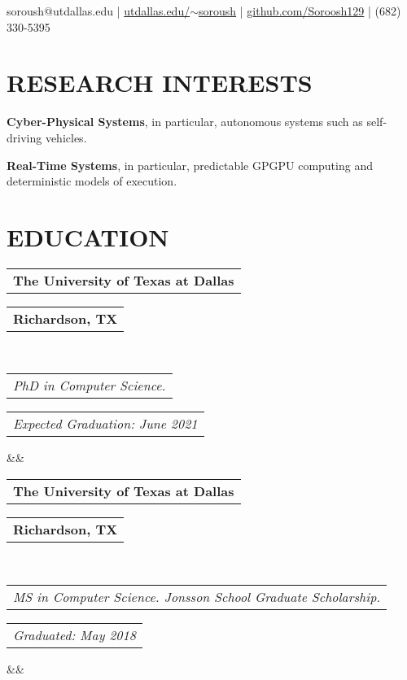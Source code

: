 \documentclass[10pt,letterpaper,sans]{moderncv}        %
\makeatletter
\newcommand*{\customcventry}[7][.25em]{
  \begin{tabular}{@{}l} 
    {\bfseries #4}
  \end{tabular}
  \hfill%
  \begin{tabular}{l@{}}
     {\bfseries #5}
  \end{tabular} \\
  \begin{tabular}{@{}l} 
    {\itshape #3}
  \end{tabular}
  \hfill%
  \begin{tabular}{l@{}}
     {\itshape #2}
  \end{tabular}
  \ifx&#7&%
  \else{\\%
    \begin{minipage}{\maincolumnwidth}%
      \small#7%
    \end{minipage}}\fi%
  \par\addvspace{#1}}
\makeatother
\begin{document}

\makecvtitle
\vspace*{-12mm}
%
\begin{flushleft}
\faEnvelopeO\hspace{0.00em} soroush@utdallas.edu |
\hspace{0.25em}\faGlobe\hspace{0.00em}
\href{https://www.utdallas.edu/~soroush/}{utdallas.edu/$\sim$soroush} |
\hspace{0.25em}\faGithub\hspace{0.00em} \href{https://github.com/Soroosh129}{github.com/Soroosh129} |
\hspace{0.25em}\faMobile\hspace{0.00em} (682) 330-5395
\end{flushleft}

\vspace{1mm}

\section{RESEARCH INTERESTS}
\textbf{Cyber-Physical Systems}, in particular, autonomous systems such as self-driving vehicles.

\textbf{Real-Time Systems}, in particular, predictable GPGPU computing and deterministic models of execution.



\section{EDUCATION}
{\customcventry{Expected Graduation: June 2021}{PhD in Computer Science.}{The University of Texas at Dallas}{Richardson, TX}{}{}}
{\customcventry{Graduated: May 2018}{MS in Computer Science. Jonsson School Graduate Scholarship.}{The University of Texas at Dallas}{Richardson, TX}{}{}}
\end{document}
